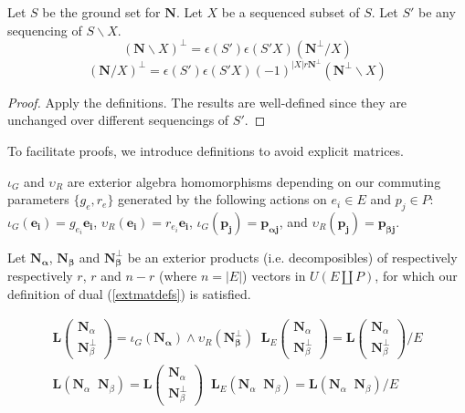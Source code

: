 \documentclass[Unicode]{cedram-alco}
\newcommand{\ext}[1]{\ensuremath{\mathbf{#1}}}
\newcommand{\eNal}{\ensuremath{\ext{N}_{\alpha}}}
\newcommand{\eNbePe}{\ensuremath{\ext{N}_{\beta}^{\perp}}}
\newcommand{\eNbe}{\ensuremath{\ext{N}_\beta}}
\newcommand{\Is}{\ensuremath{\iota}}
\newcommand{\Vs}{\ensuremath{\upsilon}}
\newcommand{\dunion}{\coprod}
\newcommand{\extLVert}[2]{\ext{L}\left( \begin{array}{c} {#1}\\ {#2} \end{array} \right)}
\newcommand{\LVert}[2]{\ext{L}\left( \begin{array}{c} {#1}\\ {#2} \end{array} \right)}
\newcommand{\LVertSub}[3]{\ext{L}_{#1}\left( \begin{array}{c} {#2}\\ {#3} \end{array} \right)}
\newcommand{\LHor}[2]{\ext{L}\left( {#1}\;\; {#2} \right)}
\newcommand{\LHorSub}[3]{\ext{L}_{#1}\left(  {#2}\;\; {#3}  \right)}
\begin{document}
\begin{prop}
  Let $S$ be the ground set for $\ext{N}$.
  Let $X$ be a sequenced subset of $S$.
  Let $S'$ be any sequencing of $S\backslash X$.
    \begin{equation} (\ext{N}\backslash X)^\perp = \epsilon(S')\epsilon(S'X)(\ext{N}^\perp/X)
    \end{equation}
    \begin{equation} (\ext{N}/X)^\perp = \epsilon(S')\epsilon(S'X)(-1)^{|X|r\ext{N}^\perp}(\ext{N}^\perp\backslash X)
    \end{equation}
\end{prop}
\begin{proof}
  Apply the definitions.  The results are well-defined since they
  are unchanged over different sequencings of $S'$.
\end{proof}

To facilitate proofs, we introduce definitions to avoid explicit matrices.
\begin{defi}
  $\Is_G$ and $\Vs_R$ are exterior algebra homomorphisms depending on our commuting parameters $\{g_e, r_e\}$ generated by
  the following actions on $e_i\in E$ and $p_j\in P$:  $\Is_G(\ext{e_i})= g_{e_i}\ext{e_i}$, $\Vs_R(\ext{e_i})=r_{e_i}\ext{e_i}$,
  $\Is_G(\ext{p_j})=\ext{p_{\alpha j}}$, and   $\Vs_R(\ext{p_j})=\ext{p_{\beta j}}$.
\end{defi}

\begin{defi}
  Let $\ext{N_\alpha}$,  $\ext{N_\beta}$ and $\ext{N_\beta^\perp}$ be an exterior products (i.e. decomposibles)
  of respectively respectively $r$, $r$ and $n-r$ (where $n=|E|$)  vectors in $U(E\dunion P)$, for which our
  definition of dual (\ref{extmatdefs}) is satisfied.
\end{defi}

\begin{defi}
  \begin{gather}
    \LVert{\eNal}{\eNbePe} = \Is_G(\ext{N_\alpha})\wedge\Vs_R(\ext{N_{\beta}^\perp})\;\;
    \LVertSub{E}{\eNal}{\eNbePe} = \LVert{\eNal}{\eNbePe}/E\\
    \LHor{\eNal}{\eNbe}=\extLVert{\eNal}{\eNbePe}\;\;
    \LHorSub{E}{\eNal}{\eNbe}=\LHor{\eNal}{\eNbe}/E
  \end{gather}
\end{defi}
\end{document}
